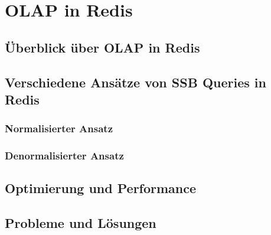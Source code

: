 \chapter{OLAP in Redis}
\section{Überblick über OLAP in Redis}
\section{Verschiedene Ansätze von \acf{SSB} Queries in Redis} %
\subsection{Normalisierter Ansatz}
\subsection{Denormalisierter Ansatz}
\section{Optimierung und Performance}
\section{Probleme und Lösungen}